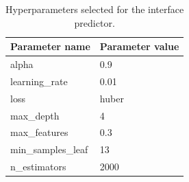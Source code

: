 \begin{table}[tb]
	\centering
	\caption[Hyperparameters selected for the interface predictor.]{
            Hyperparameters selected for the interface predictor.
        }
	\label{tab:interface_hyperparameters}
	\begin{tabular}{ l | l }
		\toprule
		Parameter name     & Parameter value \\
		\midrule
		alpha              & 0.9             \\
		learning\_rate     & 0.01            \\
		loss               & huber           \\
		max\_depth         & 4               \\
		max\_features      & 0.3             \\
		min\_samples\_leaf & 13              \\
		n\_estimators      & 2000            \\
		\bottomrule
	\end{tabular}
\end{table}
